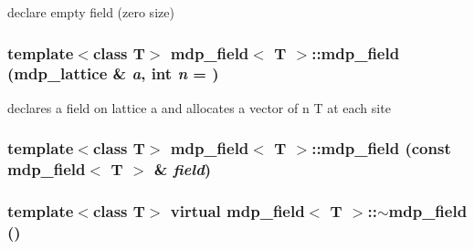 declare empty field (zero size) \hypertarget{classmdp__field_aaae273c82d9b0931e31f7265d5ca2652}{
\subsubsection[{mdp\_\-field}]{\setlength{\rightskip}{0pt plus 5cm}template$<$class T$>$ {\bf mdp\_\-field}$<$ T $>$::{\bf mdp\_\-field} ({\bf mdp\_\-lattice} \& {\em a}, \/  int {\em n} = {})}}
\label{classmdp__field_aaae273c82d9b0931e31f7265d5ca2652}


declares a field on lattice a and allocates a vector of n T at each site \hypertarget{classmdp__field_a0f143d8cceb191d24cf72025091a03a9}{
\subsubsection[{mdp\_\-field}]{\setlength{\rightskip}{0pt plus 5cm}template$<$class T$>$ {\bf mdp\_\-field}$<$ T $>$::{\bf mdp\_\-field} (const {\bf mdp\_\-field}$<$ T $>$ \& {\em field})}}
\label{classmdp__field_a0f143d8cceb191d24cf72025091a03a9}
\hypertarget{classmdp__field_a98c85b56205d56d48ff740abb5d5cbb8}{
\subsubsection[{$\sim$mdp\_\-field}]{\setlength{\rightskip}{0pt plus 5cm}template$<$class T$>$ virtual {\bf mdp\_\-field}$<$ T $>$::$\sim${\bf mdp\_\-field} ()}}
\label{classmdp__field_a98c85b56205d56d48ff740abb5d5cbb8}


